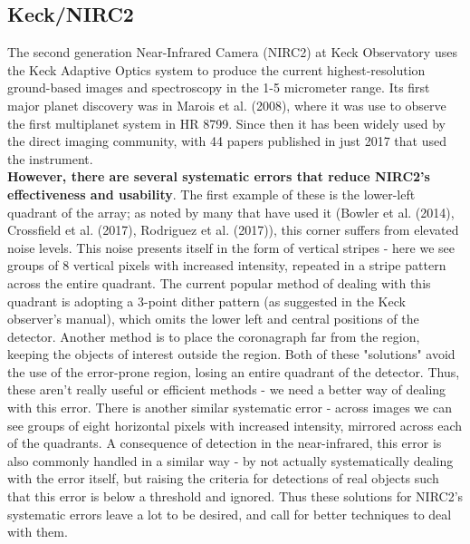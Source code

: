 \documentclass[12pt]{article}
\begin{document}
\subsection*{Keck/NIRC2}
The second generation Near-Infrared Camera (NIRC2) at Keck Observatory uses the Keck Adaptive Optics system to produce the current highest-resolution ground-based images and spectroscopy in the 1-5 micrometer range. Its first major planet discovery was in Marois et al. (2008), where it was use to observe the first multiplanet system in HR 8799. Since then it has been widely used by the direct imaging community, with 44 papers published in just 2017 that used the instrument.\\
\indent \textbf{However, there are several systematic errors that reduce NIRC2's effectiveness and usability}. The first example of these is the lower-left quadrant of the array; as noted by many that have used it (Bowler et al. (2014), Crossfield et al. (2017), Rodriguez et al. (2017)), this corner suffers from elevated noise levels. This noise presents itself in the form of vertical stripes - here we see groups of 8 vertical pixels with increased intensity, repeated in a stripe pattern across the entire quadrant. The current popular method of dealing with this quadrant is adopting a 3-point dither pattern (as suggested in the Keck observer's manual), which omits the lower left and central positions of the detector. Another method is to place the coronagraph far from the region, keeping the objects of interest outside the region. Both of these "solutions" avoid the use of the error-prone region, losing an entire quadrant of the detector. Thus, these aren't really useful or efficient methods - we need a better way of dealing with this error. There is another similar systematic error - across images we can see groups of eight horizontal pixels with increased intensity, mirrored across each of the quadrants. A consequence of detection in the near-infrared, this error is also commonly handled in a similar way - by not actually systematically dealing with the error itself, but raising the criteria for detections of real objects such that this error is below a threshold and ignored. Thus these solutions for NIRC2's systematic errors leave a lot to be desired, and call for better techniques to deal with them.
\end{document}
